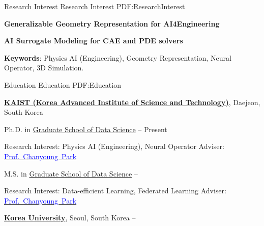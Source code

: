 \documentclass[letterpaper,MMMyyyy,nonstopmode]{simpleresumecv}
\begin{document}
\begin{Body}

\Section
{Research Interest}
{Research Interest}
{PDF:ResearchInterest}

\textbf{Generalizable Geometry Representation for AI4Engineering}
\Gap

\textbf{AI Surrogate Modeling for CAE and PDE solvers}
\Gap

\textbf{Keywords}: Physics AI (Engineering), Geometry Representation, Neural Operator, 3D Simulation.
\Entry
\Gap




\Section
{Education}
{Education}
{PDF:Education}

\Entry
\href{https://www.kaist.ac.kr/en/}
{\textbf{KAIST (Korea Advanced Institute of Science and Technology)}},
Daejeon, South Korea

\BulletItem
Ph.D. in
\href{https://gsds.kaist.ac.kr/}
{Graduate School of Data Science}
\hfill
{} --
Present
\begin{Detail}
\SubBulletItem
Research Interest: Physics AI (Engineering), Neural Operator
\SubBulletItem
Adviser:
\href{https://dsail.kaist.ac.kr/professor/}
{\textcolor{blue}{Prof.~Chanyoung~Park}}
\end{Detail}

\Gap
\BulletItem
M.S. in
\href{https://gsds.kaist.ac.kr/}
{Graduate School of Data Science}
\hfill
{} --
\begin{Detail}
\SubBulletItem
Research Interest: Data-efficient Learning, Federated Learning
\SubBulletItem
Adviser:
\href{https://dsail.kaist.ac.kr/professor/}
{\textcolor{blue}{Prof.~Chanyoung~Park}}
\end{Detail}

\BigGap
\Entry
\href{https://www.korea.edu/mbshome/mbs/en/index.do}
{\textbf{Korea University}},
Seoul, South Korea
\hfill
{} --


\end{Body}
\end{document}
